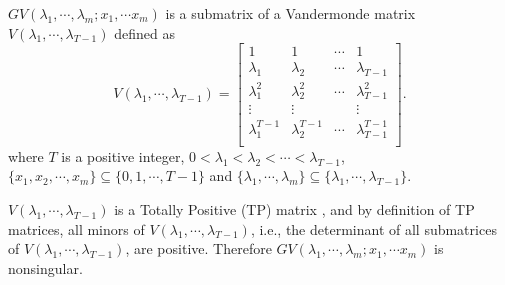 \begin{pf}
$GV(\lambda_1, \cdots, \lambda_m; x_1, \cdots x_m)$ is a submatrix of a Vandermonde matrix $V(\lambda_1, \cdots, \lambda_{T-1})$ defined as
\begin{equation}
V(\lambda_1, \cdots, \lambda_{T-1}) = 
	\begin{bmatrix}1 & 1 & \cdots & 1 \\
			\lambda_1 & \lambda_2 & \cdots & \lambda_{T-1} \\
			\lambda_1^{2} & \lambda_2^{2} & \cdots & \lambda_{T-1}^{2} \\
			\vdots & \vdots  & & \vdots\\
			\lambda_1^{T-1} & \lambda_2^{T-1} & \cdots & \lambda_{T-1}^{T-1} \\
	\end{bmatrix}.
	\end{equation}\nonumber
where $T$ is a positive integer, $0< \lambda_1 < \lambda_2 < \cdots < \lambda_{T-1}$, $\{x_1, x_2, \cdots, x_m\} \subseteq \{0, 1, \cdots, T-1\}$ and $\{ \lambda_1,\cdots, \lambda_m\} \subseteq \{ \lambda_1,\cdots, \lambda_{T-1}\} $.

$V(\lambda_1, \cdots, \lambda_{T-1})$ is a Totally Positive (TP) matrix \cite{fallat2011tnm}, and by definition of TP matrices, all minors of $V(\lambda_1, \cdots, \lambda_{T-1})$, i.e., the determinant of all submatrices of $V(\lambda_1, \cdots, \lambda_{T-1})$, are positive. Therefore $GV(\lambda_1, \cdots, \lambda_m; x_1, \cdots x_m) $ is nonsingular.
\end{pf}
\vspace{-0.4cm}

